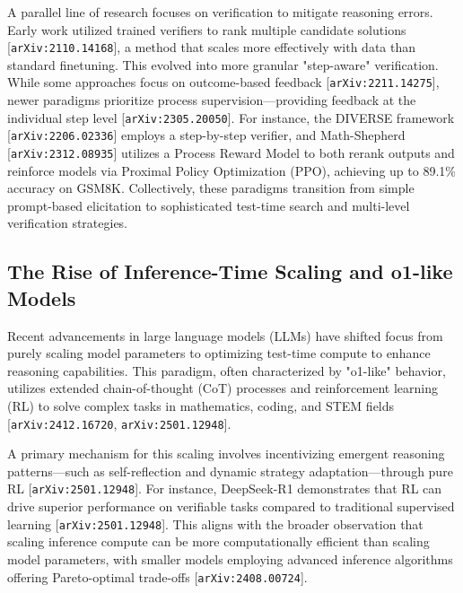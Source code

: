 \documentclass[11pt]{article}
\begin{document}
A parallel line of research focuses on verification to mitigate reasoning errors. Early work utilized trained verifiers to rank multiple candidate solutions [\texttt{arXiv:2110.14168}], a method that scales more effectively with data than standard finetuning. This evolved into more granular "step-aware" verification. While some approaches focus on outcome-based feedback [\texttt{arXiv:2211.14275}], newer paradigms prioritize process supervision—providing feedback at the individual step level [\texttt{arXiv:2305.20050}]. For instance, the DIVERSE framework [\texttt{arXiv:2206.02336}] employs a step-by-step verifier, and Math-Shepherd [\texttt{arXiv:2312.08935}] utilizes a Process Reward Model to both rerank outputs and reinforce models via Proximal Policy Optimization (PPO), achieving up to 89.1\% accuracy on GSM8K. Collectively, these paradigms transition from simple prompt-based elicitation to sophisticated test-time search and multi-level verification strategies.

\subsection{The Rise of Inference-Time Scaling and o1-like Models}

Recent advancements in large language models (LLMs) have shifted focus from purely scaling model parameters to optimizing test-time compute to enhance reasoning capabilities. This paradigm, often characterized by "o1-like" behavior, utilizes extended chain-of-thought (CoT) processes and reinforcement learning (RL) to solve complex tasks in mathematics, coding, and STEM fields [\texttt{arXiv:2412.16720}, \texttt{arXiv:2501.12948}].

A primary mechanism for this scaling involves incentivizing emergent reasoning patterns—such as self-reflection and dynamic strategy adaptation—through pure RL [\texttt{arXiv:2501.12948}]. For instance, DeepSeek-R1 demonstrates that RL can drive superior performance on verifiable tasks compared to traditional supervised learning [\texttt{arXiv:2501.12948}]. This aligns with the broader observation that scaling inference compute can be more computationally efficient than scaling model parameters, with smaller models employing advanced inference algorithms offering Pareto-optimal trade-offs [\texttt{arXiv:2408.00724}].
\end{document}

